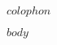 \documentclass[letterpaper,twoside,11pt]{memoir}
\begin{document}




\frontmatter

\cleartorecto
\thispagestyle{empty}
\null

\clearpage
\thispagestyle{empty}
\noindent
\begin{flushleft}
\vspace*{\fill}
{\footnotesize{}$colophon$}
\end{flushleft}



\clearpage
\thispagestyle{empty}
\tableofcontents*



\cleartorecto\mainmatter


$body$

\cleartorecto
\end{document}
